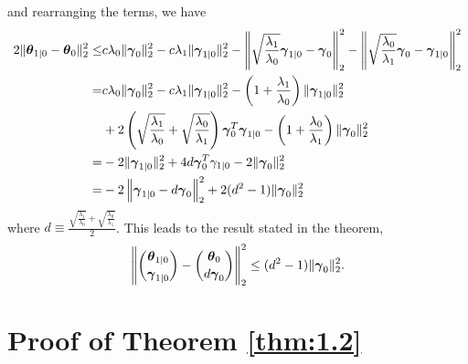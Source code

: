 and rearranging the terms, we have
\begin{gather}
    \begin{aligned}
        2\lVert\boldsymbol\theta_{1|0}-\boldsymbol\theta_{0}\rVert_2^2 \leq& c\lambda_0\lVert\boldsymbol\gamma_{0}\rVert_2^2-c\lambda_1\lVert\boldsymbol\gamma_{1|0}\rVert_2^2-\left\Vert\sqrt{\frac{\lambda_1}{\lambda_0}}\boldsymbol\gamma_{1|0}-\boldsymbol\gamma_{0}\right\Vert_2^2-\left\Vert\sqrt{\frac{\lambda_0}{\lambda_1}}\boldsymbol\gamma_{0}-\boldsymbol\gamma_{1|0}\right\Vert_2^2\\
        =&c\lambda_0\lVert\boldsymbol\gamma_{0}\rVert_2^2-c\lambda_1\lVert\boldsymbol\gamma_{1|0}\rVert_2^2-\left(1+\frac{\lambda_1}{\lambda_0}\right)\lVert\boldsymbol\gamma_{1|0}\rVert_2^2 \\
        &+2\left(\sqrt{\frac{\lambda_1}{\lambda_0}}+\sqrt{\frac{\lambda_0}{\lambda_1}}\right)\boldsymbol\gamma_{0}^T\boldsymbol\gamma_{1|0}-\left(1+\frac{\lambda_0}{\lambda_1}\right)\lVert\boldsymbol\gamma_{0}\rVert_2^2\\
        =&-2\lVert\boldsymbol\gamma_{1|0}\rVert_2^2+4d\boldsymbol\gamma_{0}^T\gamma_{1|0}-2\lVert\boldsymbol\gamma_{0}\rVert_2^2\\
        =&-2\left\Vert\boldsymbol\gamma_{1|0}-d\boldsymbol\gamma_{0}\right\Vert_2^2+2(d^2-1)\lVert\boldsymbol\gamma_{0}\rVert_2^2\\
    \end{aligned}
\end{gather}
where $d\equiv \frac{\sqrt{\frac{\lambda_1}{\lambda_0}}+\sqrt{\frac{\lambda_0}{\lambda_1}}}{2}$. This leads to the result stated in the theorem,
\begin{equation}
     \left\Vert\binom{\boldsymbol\theta_{1|0}}{\boldsymbol\gamma_{1|0}}-\binom{\boldsymbol\theta_{0}}{d\boldsymbol\gamma_{0}}\right\Vert_2^2\leq (d^2-1)\lVert\boldsymbol\gamma_{0}\rVert_2^2.
\end{equation}

\section{Proof of Theorem \ref{thm:1.2}}


